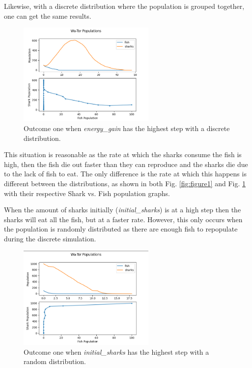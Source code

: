 \documentclass[12pt]{iopart} %
\begin{document}
Likewise, with a discrete distribution where the population is grouped together, one can get the same results.

\begin{figure}[!htbp]
  \begin{center}
  \item[]\includegraphics[width=0.6\textwidth]{figure2.png}
  \caption{\label{fig:figure2}
  Outcome one when \emph{energy\_gain} has the highest step with a discrete distribution.
  }
  \end{center}
\end{figure}

This situation is reasonable as the rate at which the sharks consume the fish is high, then the fish die out faster than they can reproduce and the sharks die due to the lack of fish to eat. 
The only difference is the rate at which this happens is different between the distributions, as shown in both Fig. \ref{fig:figure1} and Fig. \ref{fig:figure2} with their respective Shark vs. Fish population graphs.

When the amount of sharks initially (\emph{initial\_sharks}) is at a high step then the sharks will eat all the fish, but at a faster rate. 
However, this only occurs when the population is randomly distributed as there are enough fish to repopulate during the discrete simulation.

\begin{figure}[h!tbp]
  \begin{center}
  \item[]\includegraphics[width=0.6\textwidth]{figure3.png}
  \caption{\label{fig:figure3}
  Outcome one when \emph{initial\_sharks} has the highest step with a random distribution.
  }
  \end{center}
\end{figure}
\end{document}
